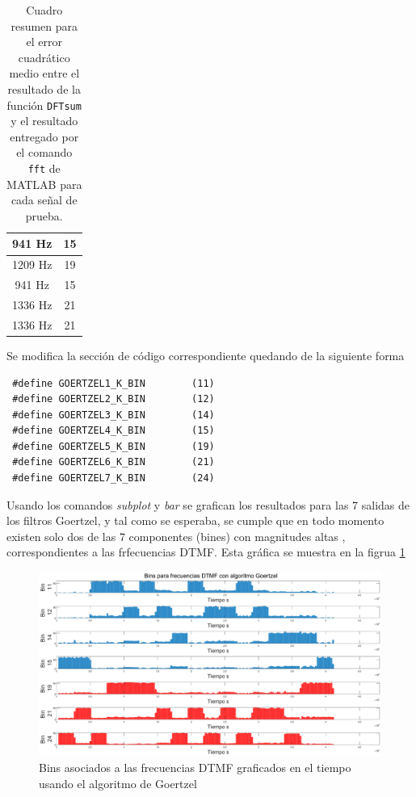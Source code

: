 \begin{enumerate}
\begin{table}[H]
\begin{tabular}{|c|c|}
941  Hz & 15\\
\hline


1209  Hz & 19\\
\hline
 
941  Hz & 15\\
\hline
 
1336 Hz & 21\\
\hline

1336 Hz & 21\\
\hline

        \end{tabular}
        \caption{Cuadro resumen para el error cuadrático medio entre el resultado de la función \texttt{DFTsum} y el resultado entregado por el comando \texttt{fft} de MATLAB para cada señal de prueba.}
        \label{MSE}
    \end{table}
    
    
Se modifica la sección de código correspondiente quedando de la siguiente forma 

\begin{lstlisting}
 #define GOERTZEL1_K_BIN	    (11)
 #define GOERTZEL2_K_BIN	    (12)
 #define GOERTZEL3_K_BIN	    (14)
 #define GOERTZEL4_K_BIN	    (15)
 #define GOERTZEL5_K_BIN	    (19)
 #define GOERTZEL6_K_BIN	    (21)
 #define GOERTZEL7_K_BIN	    (24)
\end{lstlisting}


Usando los comandos \textit{subplot} y \textit{bar} se grafican los resultados para las 7 salidas de los filtros Goertzel, y tal como se esperaba, se cumple que en todo momento existen solo dos de las 7 componentes (bines) con magnitudes altas , correspondientes a las frfecuencias DTMF. Esta gráfica se muestra en la figrua \ref{dtmf}

\begin{figure}[H]
    \centering
    \includegraphics[scale = 0.35]{Figuras/p7_2.eps}
    \caption{Bins asociados a las frecuencias DTMF graficados en el tiempo usando el algoritmo de Goertzel}
    \label{dtmf}
\end{figure}

\end{enumerate}

  
  
  
  

  


